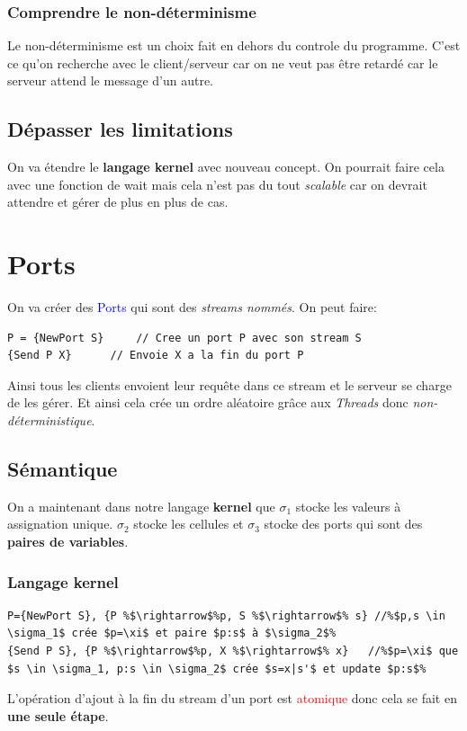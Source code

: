 \documentclass{report}
\begin{document}
\subsubsection{Comprendre le non-déterminisme} 
Le non-déterminisme est un choix fait en dehors du controle du programme. C'est ce qu'on recherche avec le client/serveur car on ne veut pas être retardé car le serveur attend le message d'un autre.

\subsection{Dépasser les limitations}
On va étendre le \textbf{langage kernel} avec nouveau concept. On pourrait faire cela avec une fonction de wait mais cela n'est pas du tout \textit{scalable} car on devrait attendre et gérer de plus en plus de cas.

\section{Ports}
On va créer des \textcolor{blue}{Ports} qui sont des \textit{streams nommés}. On peut faire:
\begin{lstlisting}[escapechar=\%]
P = {NewPort S} 	// Cree un port P avec son stream S
{Send P X}	 	// Envoie X a la fin du port P 
\end{lstlisting}
Ainsi tous les clients envoient leur requête dans ce stream et le serveur se charge de les gérer. Et ainsi cela crée un ordre aléatoire grâce aux \textit{Threads} donc \textit{non-déterministique}.

\subsection{Sémantique}
On a maintenant dans notre langage \textbf{kernel} que $\sigma_1$ stocke les valeurs à assignation unique. $\sigma_2$ stocke les cellules et $\sigma_3$ stocke des ports qui sont des \textbf{paires de variables}.

\subsubsection{Langage kernel}
\begin{lstlisting}[escapechar=\%]
P={NewPort S}, {P %$\rightarrow$%p, S %$\rightarrow$% s} //%$p,s \in \sigma_1$ crée $p=\xi$ et paire $p:s$ à $\sigma_2$%
{Send P S}, {P %$\rightarrow$%p, X %$\rightarrow$% x}	//%$p=\xi$ que $s \in \sigma_1, p:s \in \sigma_2$ crée $s=x|s'$ et update $p:s$%
\end{lstlisting}
L'opération d'ajout à la fin du stream d'un port est \textcolor{red}{atomique} donc cela se fait en \textbf{une seule étape}.
\end{document}
